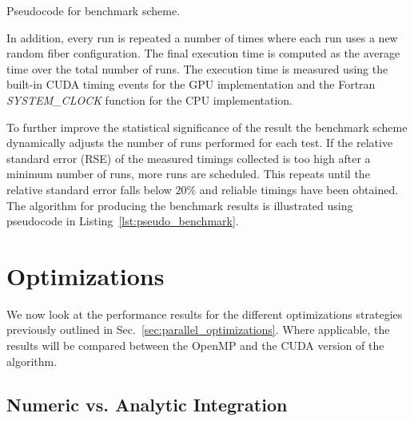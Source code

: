 \begin{listing}[htbp]
  \centering
  \inputminted[mathescape,
    linenos,
    numbersep=5pt,
    fontsize=\footnotesize,
    frame=lines,
    framesep=2mm]{c}{lst/benchmark_scheme.lst}
  \caption{Pseudocode for benchmark scheme.}
  \label{lst:pseudo_benchmark}
\end{listing}

In addition, every run is repeated a number of times where each run uses a new random fiber configuration. The final execution time is computed as the average time over the total number of runs. The execution time is measured using the built-in CUDA timing events for the GPU implementation and the Fortran \emph{SYSTEM\_CLOCK} function for the CPU implementation.

To further improve the statistical significance of the result the benchmark scheme dynamically adjusts the number of runs performed for each test. If the relative standard error (RSE) of the measured timings collected is too high after a minimum number of runs, more runs are scheduled. This repeats until the relative standard error falls below $20\%$ and reliable timings have been obtained.  The algorithm for producing the benchmark results is illustrated using pseudocode in Listing~\ref{lst:pseudo_benchmark}. 

\section{Optimizations}
\label{sec:bench_optimization}

We now look at the performance results for the different optimizations strategies previously outlined in Sec.~\ref{sec:parallel_optimizations}. Where applicable, the results will be compared between the OpenMP and the CUDA version of the algorithm.

\subsection{Numeric vs. Analytic Integration}
\label{subsec:bench_numeric_vs_analytic}

